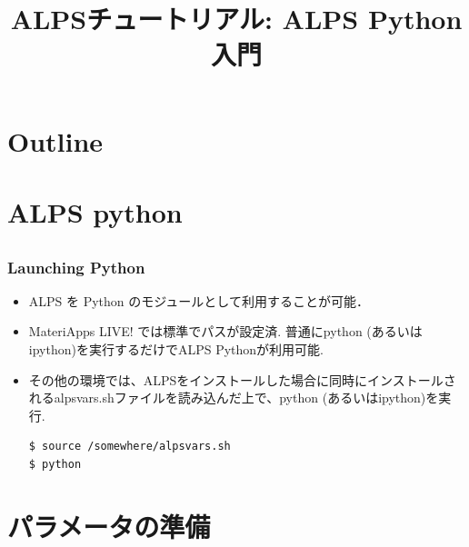
\title{ALPSチュートリアル: ALPS Python入門}



\begin{frame}
 \titlepage
\end{frame}

\section*{Outline}
\begin{frame}
 \tableofcontents
\end{frame}

\section{ALPS python}
\subsection*{\redm\whiteb\greenb}

\begin{frame}[t,fragile]
 \frametitle{Launching Python}
 \begin{itemize}
 \item \alert{ALPS を Python のモジュールとして利用することが可能．}

 \item MateriApps LIVE! では標準でパスが設定済. 普通にpython (あるいはipython)を実行するだけでALPS Pythonが利用可能.

 \item その他の環境では、ALPSをインストールした場合に同時にインストールされるalpsvars.shファイルを読み込んだ上で、python (あるいはipython)を実行.
\begin{lstlisting}
$ source /somewhere/alpsvars.sh
$ python
\end{lstlisting}
\end{itemize}
\end{frame}

\section{パラメータの準備}
\subsection*{\redm\whiteb\greenb}

